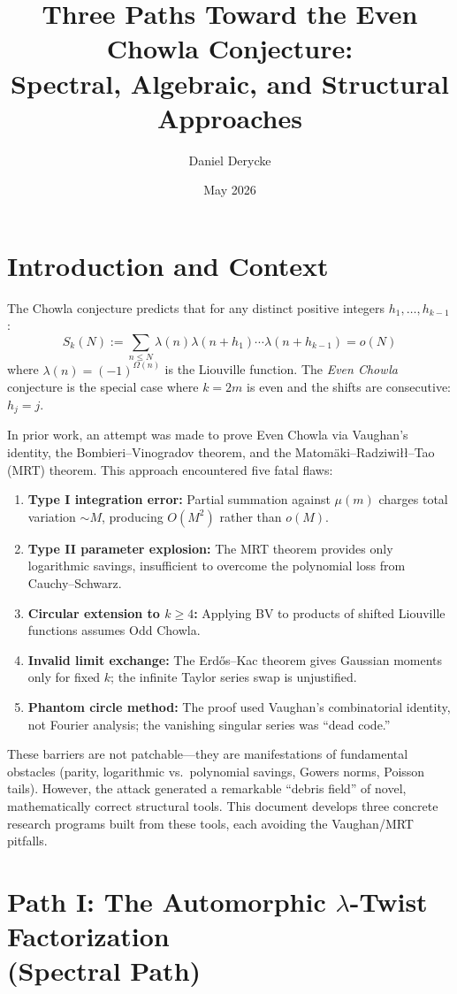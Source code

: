 \documentclass[11pt,a4paper]{article}
\title{Three Paths Toward the Even Chowla Conjecture:\\
Spectral, Algebraic, and Structural Approaches}
\author{Daniel Derycke}
\date{May 2026}
\theoremstyle{definition}
\begin{document}
\tableofcontents
\newpage

\section{Introduction and Context}

The Chowla conjecture predicts that for any distinct positive integers $h_1, \ldots, h_{k-1}$:
\begin{equation}
S_k(N) := \sum_{n \le N} \lambda(n)\lambda(n+h_1)\cdots\lambda(n+h_{k-1}) = o(N)
\end{equation}
where $\lambda(n) = (-1)^{\Omega(n)}$ is the Liouville function. The \emph{Even Chowla} conjecture is the special case where $k = 2m$ is even and the shifts are consecutive: $h_j = j$.

In prior work, an attempt was made to prove Even Chowla via Vaughan's identity, the Bombieri--Vinogradov theorem, and the Matom\"aki--Radziwi\l\l--Tao (MRT) theorem. This approach encountered five fatal flaws:
\begin{enumerate}
\item \textbf{Type I integration error:} Partial summation against $\mu(m)$ charges total variation $\sim M$, producing $O(M^2)$ rather than $o(M)$.
\item \textbf{Type II parameter explosion:} The MRT theorem provides only logarithmic savings, insufficient to overcome the polynomial loss from Cauchy--Schwarz.
\item \textbf{Circular extension to $k \ge 4$:} Applying BV to products of shifted Liouville functions assumes Odd Chowla.
\item \textbf{Invalid limit exchange:} The Erd\H{o}s--Kac theorem gives Gaussian moments only for fixed $k$; the infinite Taylor series swap is unjustified.
\item \textbf{Phantom circle method:} The proof used Vaughan's combinatorial identity, not Fourier analysis; the vanishing singular series was ``dead code.''
\end{enumerate}

These barriers are not patchable---they are manifestations of fundamental obstacles (parity, logarithmic vs.\ polynomial savings, Gowers norms, Poisson tails). However, the attack generated a remarkable ``debris field'' of novel, mathematically correct structural tools. This document develops three concrete research programs built from these tools, each avoiding the Vaughan/MRT pitfalls.

\section{Path I: The Automorphic $\lambda$-Twist Factorization\\ (Spectral Path)}
\end{document}
